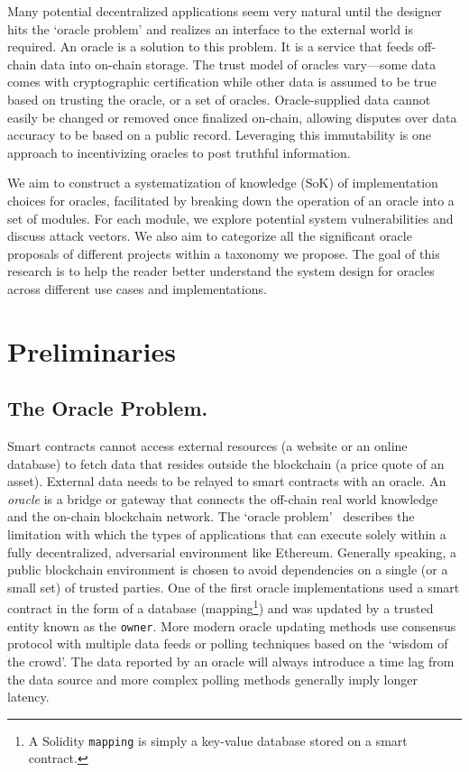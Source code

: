 Many potential decentralized applications seem very natural until the designer hits the `oracle problem' and realizes an interface to the external world is required. An oracle is a solution to this problem. It is a service that feeds off-chain data into on-chain storage. The trust model of oracles vary---some data comes with cryptographic certification while other data is assumed to be true based on trusting the oracle, or a set of oracles. Oracle-supplied data cannot easily be changed or removed once finalized on-chain, allowing disputes over data accuracy to be based on a public record. Leveraging this immutability is one approach to incentivizing oracles to post truthful information.

We aim to construct a systematization of knowledge (SoK) of implementation choices for oracles, facilitated by breaking down the operation of an oracle into a set of modules. For each module, we explore potential system vulnerabilities and discuss attack vectors. We also aim to categorize all the significant oracle proposals of different projects within a taxonomy we propose. The goal of this research is to help the reader better understand the system design for oracles across different use cases and implementations.


\section{Preliminaries}



\subsection{The Oracle Problem.}  

Smart contracts cannot access external resources (\eg a website or an online database) to fetch data that resides outside the blockchain (\eg a price quote of an asset). External data needs to be relayed to smart contracts with an oracle. An \emph{oracle} is a bridge or gateway that connects the off-chain real world knowledge and the on-chain blockchain network. The `oracle problem'~\cite{linkOracleProblem} describes the limitation with which the types of applications that can execute solely within a fully decentralized, adversarial environment like Ethereum. Generally speaking, a public blockchain environment is chosen to avoid dependencies on a single (or a small set) of trusted parties. One of the first oracle implementations used a smart contract in the form of a database (\ie mapping\footnote{A Solidity \texttt{mapping} is simply a key-value database stored on a smart contract.}) and was updated by a trusted entity known as the \texttt{owner}. More modern oracle updating methods use consensus protocol with multiple data feeds or polling techniques based on the `wisdom of the crowd'. The data reported by an oracle will always introduce a time lag from the data source and more complex polling methods generally imply longer latency.

